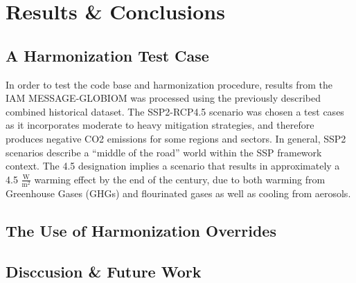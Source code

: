 \section{Results \& Conclusions}

\subsection{A Harmonization Test Case}

In order to test the  code base and harmonization procedure,
results from the IAM MESSAGE-GLOBIOM  was processed using the
previously described combined historical dataset. The SSP2-RCP4.5 scenario was
chosen a test cases as it incorporates moderate to heavy mitigation strategies,
and therefore produces negative CO2 emissions for some regions and sectors. In
general, SSP2 scenarios describe a ``middle of the road'' world within the SSP
framework context. The 4.5 designation implies a scenario that results in
approximately a 4.5 $\frac{\text{W}}{\text{m}^2}$ warming effect by the end of
the century, due to both warming from Greenhouse Gases (GHGs) and flourinated
gases as well as cooling from aerosols.



\subsection{The Use of Harmonization Overrides}

\subsection{Disccusion \& Future Work}


